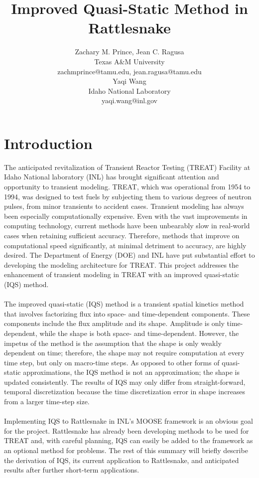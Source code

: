 \documentclass[11pt]{scrartcl}
\title{\LARGE Improved Quasi-Static Method in Rattlesnake}
\author{ 
{\normalsize Zachary M. Prince, Jean C. Ragusa} \\ 
{\normalsize Texas A\&M University} \\  
{\normalsize zachmprince@tamu.edu, jean.ragusa@tamu.edu} \\ 
{\normalsize Yaqi Wang} \\ 
{\normalsize Idaho National Laboratory} \\  
{\normalsize yaqi.wang@inl.gov}
}
\begin{document}
\maketitle
{}

\section{Introduction}

The anticipated revitalization of Transient Reactor Testing (TREAT) Facility at Idaho National laboratory (INL) has brought significant attention and opportunity to transient modeling.  TREAT, which was operational from 1954 to 1994, was designed to test fuels by subjecting them to various degrees of neutron pulses, from minor transients to accident cases.  Transient modeling has always been especially computationally expensive. Even with the vast improvements in computing technology, current methods have been unbearably slow in real-world cases when retaining sufficient accuracy.  Therefore, methods that improve on computational speed significantly, at minimal detriment to accuracy, are highly desired. The Department of Energy (DOE) and INL have put substantial effort to developing the modeling architecture for TREAT.  This project addresses the enhancement of transient modeling in TREAT with an improved quasi-static (IQS) method.
\\ \\
The improved quasi-static (IQS) method is a transient spatial kinetics method that involves factorizing flux into space- and time-dependent components.  These components include the flux amplitude and its shape. Amplitude is only time-dependent, while the shape is both space- and time-dependent.  However, the impetus of the method is the assumption that the shape is only weakly dependent on time; therefore, the shape may not require computation at every time step, but only on macro-time steps. As opposed to other forms of quasi-static approximations, the IQS method is not an approximation; the shape is updated consistently.  The results of IQS may only differ from straight-forward, temporal discretization because the time discretization error in shape increases from a larger time-step size. 
\\ \\
Implementing IQS to Rattlesnake in INL's MOOSE framework is an obvious goal for the project.  Rattlesnake has already been developing methods to be used for TREAT and, with careful planning, IQS can easily be added to the framework as an optional method for problems.  The rest of this summary will briefly describe the derivation of IQS, its current application to Rattlesnake, and anticipated results after further short-term applications.
\end{document}
